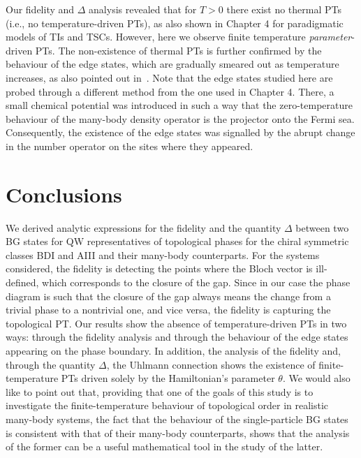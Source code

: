 Our fidelity and $\Delta$ analysis revealed that for $T>0$ there exist no thermal PTs (i.e., no temperature-driven PTs), as also shown in Chapter 4 for paradigmatic models of TIs and TSCs. However, here we observe finite temperature \emph{parameter}-driven PTs. The non-existence of thermal PTs is further confirmed by the behaviour of the edge states, which are gradually smeared out as temperature increases, as also pointed out in~\cite{viy:riv:del:14}. Note that the edge states studied here are probed through a different method from the one used in Chapter 4. There, a small chemical potential was introduced in such a way that the zero-temperature behaviour of the many-body density operator is the projector onto the Fermi sea. Consequently, the existence of the edge states was signalled by the abrupt change in the number operator on the sites where they appeared.





\section{Conclusions}
\label{Conclusions and Outlook}
We derived analytic expressions for the fidelity and the quantity $\Delta$ between two BG states for QW representatives of topological phases for the chiral symmetric classes BDI and AIII and their many-body counterparts. For the systems considered, the fidelity is detecting the points where the Bloch vector is ill-defined, which corresponds to the closure of the gap. Since in our case the phase diagram is such that the closure of the gap always means the change from a trivial phase to a nontrivial one, and vice versa, the fidelity is capturing the topological PT. Our results show the absence of temperature-driven PTs in two ways: through the fidelity analysis and through the behaviour of the edge states appearing on the phase boundary. In addition, the analysis of the fidelity and, through the quantity $\Delta$, the Uhlmann connection shows the existence of finite-temperature PTs driven solely by the Hamiltonian's parameter $\theta$. We would also like to point out that, providing that one of the goals of this study is to investigate the finite-temperature behaviour of topological order in realistic many-body systems, the fact that the behaviour of the single-particle BG states is consistent with that of their many-body counterparts, shows that the analysis of the former can be a useful mathematical tool in the study of the latter.

